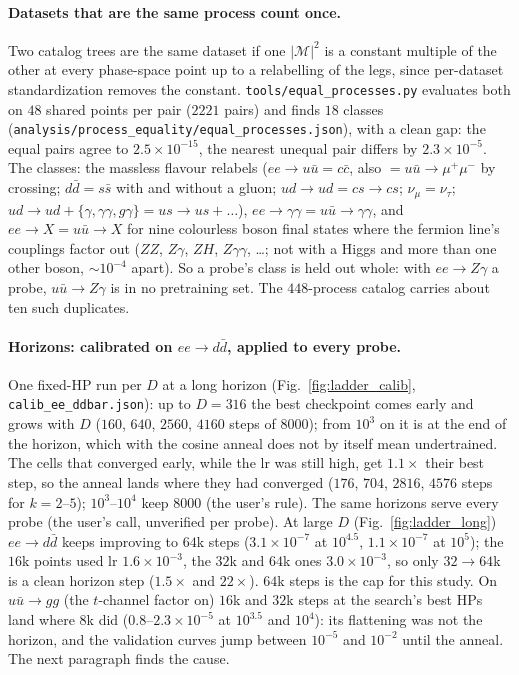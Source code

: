 \documentclass[11pt]{article}
\newcommand{\code}[1]{\texttt{#1}}
\begin{document}
\paragraph{Datasets that are the same process count once.} Two catalog trees are the same
dataset if one $|\mathcal M|^2$ is a constant multiple of the other at every phase-space point
up to a relabelling of the legs, since per-dataset standardization removes the constant.
\code{tools/equal\_processes.py} evaluates both on $48$ shared points per pair ($2221$ pairs)
and finds $18$ classes (\code{analysis/process\_equality/equal\_processes.json}), with a clean
gap: the equal pairs agree to $2.5\times10^{-15}$, the nearest unequal pair differs by
$2.3\times10^{-5}$. The classes: the massless flavour relabels ($ee\to u\bar u=c\bar c$, also
$=u\bar u\to\mu^+\mu^-$ by crossing; $d\bar d=s\bar s$ with and without a gluon; $ud\to ud=cs\to
cs$; $\nu_\mu=\nu_\tau$; $ud\to ud+\{\gamma,\gamma\gamma,g\gamma\}=us\to us+\dots$),
$ee\to\gamma\gamma=u\bar u\to\gamma\gamma$, and $ee\to X=u\bar u\to X$ for nine colourless
boson final states where the fermion line's couplings factor out ($ZZ$, $Z\gamma$, $ZH$,
$Z\gamma\gamma$, \dots; not with a Higgs and more than one other boson, $\sim10^{-4}$ apart). So a
probe's class is held out whole: with $ee\to Z\gamma$ a probe, $u\bar u\to Z\gamma$ is in no
pretraining set. The $448$-process catalog carries about ten such duplicates.

\paragraph{Horizons: calibrated on $ee\to d\bar d$, applied to every probe.} One fixed-HP run
per $D$ at a long horizon (Fig.~\ref{fig:ladder_calib}, \code{calib\_ee\_ddbar.json}): up to
$D=316$ the best checkpoint comes early and grows with $D$ ($160$, $640$, $2560$, $4160$ steps of
$8000$); from $10^3$ on it is at the end of the horizon, which with the cosine anneal does not by
itself mean undertrained. The cells that converged early, while the lr was still high, get
$1.1\times$ their best step, so the anneal lands where they had converged ($176$, $704$, $2816$,
$4576$ steps for $k=2$--$5$); $10^3$--$10^4$ keep $8000$ (the user's rule). The same horizons
serve every probe (the user's call, unverified per probe). At large $D$
(Fig.~\ref{fig:ladder_long}) $ee\to d\bar d$ keeps improving to $64$k steps
($3.1\times10^{-7}$ at $10^{4.5}$, $1.1\times10^{-7}$ at $10^5$); the $16$k points used lr
$1.6\times10^{-3}$, the $32$k and $64$k ones $3.0\times10^{-3}$, so only $32\to64$k is a clean
horizon step ($1.5\times$ and $22\times$). $64$k steps is the cap for this study. On $u\bar u\to
gg$ (the $t$-channel factor on) $16$k and $32$k steps at the search's best HPs land where $8$k did
($0.8$--$2.3\times10^{-5}$ at $10^{3.5}$ and $10^4$): its flattening was not the horizon, and
the validation curves jump between $10^{-5}$ and $10^{-2}$ until the anneal. The next paragraph
finds the cause.
\end{document}
